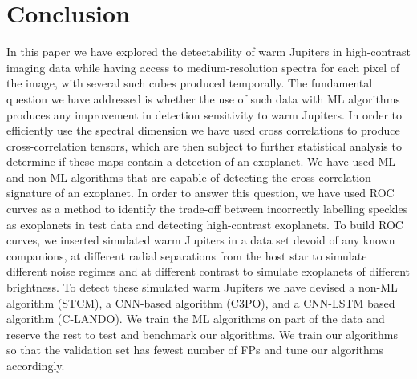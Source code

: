 \documentclass{aa}
\begin{document}

\section{Conclusion}

In this paper we have explored the detectability of warm Jupiters in high-contrast imaging data while having access to medium-resolution spectra for each pixel of the image, with several such cubes produced temporally.
The fundamental question we have addressed is whether the use of such data with ML algorithms produces any improvement in detection sensitivity to warm Jupiters.
In order to efficiently use the spectral dimension we have used cross correlations to produce cross-correlation tensors, which are then subject to further statistical analysis to determine if these maps contain a detection of an exoplanet.
We have used ML and non ML algorithms that are capable of detecting the cross-correlation signature of an exoplanet. %
In order to answer this question, we have used ROC curves as a method to identify the trade-off between incorrectly labelling speckles as exoplanets in test data and detecting high-contrast exoplanets.
To build ROC curves, we inserted simulated warm Jupiters in a data set devoid of any known companions, at different radial separations from the host star to simulate different noise regimes and at different contrast to simulate exoplanets of different brightness.
To detect these simulated warm Jupiters we have devised a non-ML algorithm (STCM), a CNN-based algorithm (C3PO), and a CNN-LSTM based algorithm (C-LANDO). 
We train the ML algorithms on part of the data and reserve the rest to test and benchmark our algorithms. 
We train our algorithms so that the validation set has fewest number of FPs and tune our algorithms accordingly. 

\end{document}
